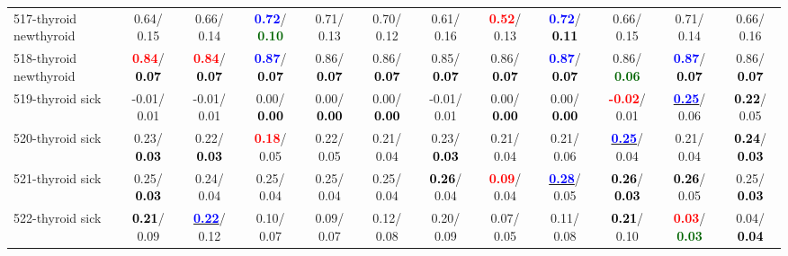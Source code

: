 \begin{table}[h]
\begin{center}
{\begin{tabular}{lc|c|c|c|c|c|c|c|c|c|c}
517-thyroid newthyroid &   0.64/  0.15 &   0.66/  0.14 & \textcolor{blue}{\textbf{  0.72}}/\textcolor{darkgreen}{\textbf{  0.10}} &   0.71/  0.13 &   0.70/  0.12 &   0.61/  0.16 & \textcolor{red}{\textbf{  0.52}}/  0.13 & \textcolor{blue}{\textbf{  0.72}}/\textcolor{black}{\textbf{  0.11}} &   0.66/  0.15 &   0.71/  0.14 &   0.66/  0.16 \\
518-thyroid newthyroid & \textcolor{red}{\textbf{  0.84}}/\textcolor{black}{\textbf{  0.07}} & \textcolor{red}{\textbf{  0.84}}/\textcolor{black}{\textbf{  0.07}} & \textcolor{blue}{\textbf{  0.87}}/\textcolor{black}{\textbf{  0.07}} &   0.86/\textcolor{black}{\textbf{  0.07}} &   0.86/\textcolor{black}{\textbf{  0.07}} &   0.85/\textcolor{black}{\textbf{  0.07}} &   0.86/\textcolor{black}{\textbf{  0.07}} & \textcolor{blue}{\textbf{  0.87}}/\textcolor{black}{\textbf{  0.07}} &   0.86/\textcolor{darkgreen}{\textbf{  0.06}} & \textcolor{blue}{\textbf{  0.87}}/\textcolor{black}{\textbf{  0.07}} &   0.86/\textcolor{black}{\textbf{  0.07}} \\
519-thyroid sick &  -0.01/  0.01 &  -0.01/  0.01 &   0.00/\textcolor{black}{\textbf{  0.00}} &   0.00/\textcolor{black}{\textbf{  0.00}} &   0.00/\textcolor{black}{\textbf{  0.00}} &  -0.01/  0.01 &   0.00/\textcolor{black}{\textbf{  0.00}} &   0.00/\textcolor{black}{\textbf{  0.00}} & \textcolor{red}{\textbf{ -0.02}}/  0.01 & \underline{\textcolor{blue}{\textbf{  0.25}}}/  0.06 & \textcolor{black}{\textbf{  0.22}}/  0.05 \\ \hline
520-thyroid sick &   0.23/\textcolor{black}{\textbf{  0.03}} &   0.22/\textcolor{black}{\textbf{  0.03}} & \textcolor{red}{\textbf{  0.18}}/  0.05 &   0.22/  0.05 &   0.21/  0.04 &   0.23/\textcolor{black}{\textbf{  0.03}} &   0.21/  0.04 &   0.21/  0.06 & \underline{\textcolor{blue}{\textbf{  0.25}}}/  0.04 &   0.21/  0.04 & \textcolor{black}{\textbf{  0.24}}/\textcolor{black}{\textbf{  0.03}} \\
521-thyroid sick &   0.25/\textcolor{black}{\textbf{  0.03}} &   0.24/  0.04 &   0.25/  0.04 &   0.25/  0.04 &   0.25/  0.04 & \textcolor{black}{\textbf{  0.26}}/  0.04 & \textcolor{red}{\textbf{  0.09}}/  0.04 & \underline{\textcolor{blue}{\textbf{  0.28}}}/  0.05 & \textcolor{black}{\textbf{  0.26}}/\textcolor{black}{\textbf{  0.03}} & \textcolor{black}{\textbf{  0.26}}/  0.05 &   0.25/\textcolor{black}{\textbf{  0.03}} \\
522-thyroid sick & \textcolor{black}{\textbf{  0.21}}/  0.09 & \underline{\textcolor{blue}{\textbf{  0.22}}}/  0.12 &   0.10/  0.07 &   0.09/  0.07 &   0.12/  0.08 &   0.20/  0.09 &   0.07/  0.05 &   0.11/  0.08 & \textcolor{black}{\textbf{  0.21}}/  0.10 & \textcolor{red}{\textbf{  0.03}}/\textcolor{darkgreen}{\textbf{  0.03}} &   0.04/\textcolor{black}{\textbf{  0.04}} \\

\end{tabular}}
\end{center}
\end{table}
